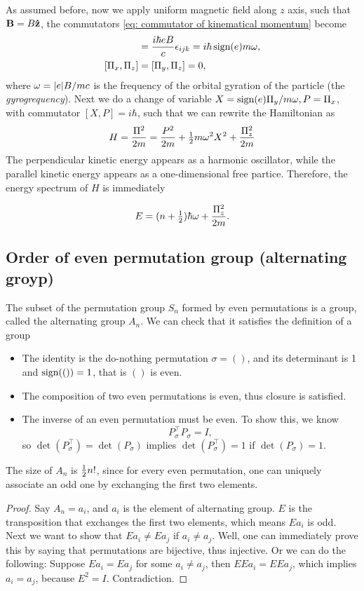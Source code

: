 \documentclass[10pt]{article}
\begin{document}
	As assumed before, now we apply uniform magnetic field along $z$ axis, such that ${\bf B} = B \vu{z}$, the commutators \eqref{eq: commutator of kinematical momentum} become
	\begin{align*}
		[\Pi_x, \Pi_y] &= \frac{i \hbar e B}{c} \eps_{ijk} = i \hbar \sign(e) m \omega, \\
		[\Pi_x, \Pi_z] &= [\Pi_y, \Pi_z] = 0,
	\end{align*}
	where $\omega = \abs{e}B/mc$ is the frequency of the orbital gyration of the particle (the \textit{gyrogrequency}).
	Next we do a change of variable $X = \operatorname{sign}(e)\Pi_y/m\omega, P = \Pi_x$, with commutator $[X,P] = i\hbar$, such that we can rewrite the Hamiltonian as
	\begin{equation}
		H = \frac{\Pi^2}{2m} = \frac{P^2}{2m} + \tfrac{1}{2} m \omega^2 X^2 + \frac{\Pi_z^2}{2m}
	\end{equation}
	The perpendicular kinetic energy appears as a harmonic oscillator, while the parallel kinetic energy appears as a one-dimensional free partice. Therefore, the energy spectrum of $H$ is immediately

	\begin{equation}
		E = (n+\tfrac{1}{2})\hbar \omega + \frac{\Pi_z^2}{2m}.
	\end{equation}

	\subsection{Order of even permutation group (alternating groyp)}

	The subset of the permutation group $S_n$ formed by even permutations is a group, called the alternating group $A_n$. We can check that it satisfies the definition of a group
	\begin{itemize}
		\item The identity is the do-nothing permutation $\sigma = ()$, and its determinant is 1 and $\operatorname{sign} (()) = 1$, that is $()$ is even.
		\item The composition of two even permutations is even, thus closure is satisfied.
		\item The inverse of an even permutation must be even. To show this, we know
		\begin{equation}
			P_{\sigma}^{\top} P_{\sigma} = I,
		\end{equation}
		so $\det(P_{\sigma}^{\top}) = \det(P_{\sigma})$ implies $\det(P_{\sigma}^{\top}) = 1$ if $\det(P_{\sigma}) = 1$.
	\end{itemize}
	The size of $A_n$ is $\tfrac{1}{2} n!$, since for every even permutation, one can uniquely associate an odd one by exchanging the first two elements.
	\begin{proof}
			Say $A_n = {a_i}$, and $a_i$ is the element of alternating group. $E$ is the transposition that exchanges the first two elements, which means $E a_i$ is odd.
			Next we want to show that $E a_i \neq E a_j$ if $a_i \neq a_j$. Well, one can immediately prove this by saying that permutations are bijective, thus injective. Or we can do the following: Suppose $E a_i = E a_j$ for some $a_i \neq a_j$, then $E E a_i = E E a_j$, which implies $a_i = a_j$, because $E^2 = I$. Contradiction.
	\end{proof}
\end{document}
